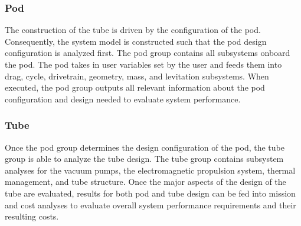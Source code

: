 \subsubsection{Pod}
The construction of the tube is driven by the configuration of the pod. Consequently, the system model is constructed such that the pod design configuration is analyzed first. The pod group contains all subsystems onboard the pod. The pod takes in user variables set by the user and feeds them into drag, cycle, drivetrain, geometry, mass, and levitation subsystems. When executed, the pod group outputs all relevant information about the pod configuration and design needed to evaluate system performance.
\subsubsection{Tube}
Once the pod group determines the design configuration of the pod, the tube group is able to analyze the tube design. The tube group contains subsystem analyses for the vacuum pumps, the electromagnetic propulsion system, thermal management, and tube structure. Once the major aspects of the design of the tube are evaluated, results for both pod and tube design can be fed into mission and cost analyses to evaluate overall system performance requirements and their resulting costs. 
